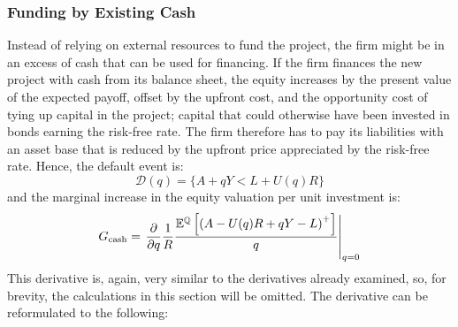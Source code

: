 \documentclass[main.tex]{subfiles}
\begin{document}
    \subsubsection{Funding by Existing Cash}
        Instead of relying on external resources to fund the project,
        the firm might be in an excess of cash that can be used for financing.
        If the firm finances the new project with cash from its balance sheet, 
        the equity increases by the present value of the expected payoff,
        offset by the upfront cost, and the opportunity cost of tying up capital in the project;
        capital that could otherwise have been invested in bonds earning the risk-free rate.
        The firm therefore has to pay its liabilities with an asset base that is
        reduced by the upfront price appreciated by the risk-free rate.
        Hence, the default event is:
            \begin{equation*}
                \mathcal{D}(q)
                = 
                \{
                    A + qY < L + U(q)R
                \}
            \end{equation*}
        and the marginal increase in the equity valuation per unit investment is:
            \begin{equation*}
                G_{\text{cash}} =
                    \left.
                    \frac{\partial }{\partial q} 
                    \frac{1}{R}
                    \frac{
                        \mathbb{E}^{\mathbb{Q}}\left[
                            \left(
                                A - U(q)R + qY - L
                            \right)^{+}
                        \right] 
                    }{
                        q
                    } 
                    \right\rvert_{q=0}
            \end{equation*}
        This derivative is, again, very similar to the derivatives already examined,
        so, for brevity, the calculations in this section will be omitted.
        The derivative can be reformulated to the following:
\end{document}
